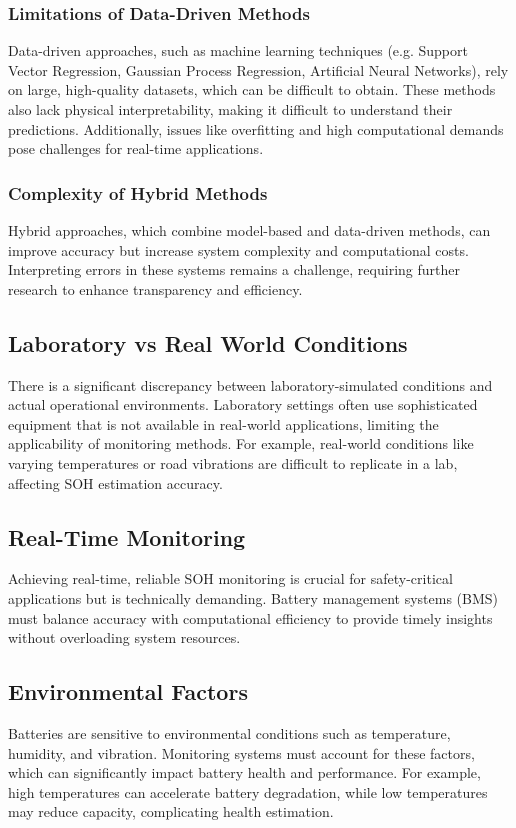 \subsubsection{Limitations of Data-Driven Methods}
Data-driven approaches, such as machine learning techniques (e.g. Support Vector Regression, Gaussian Process Regression, Artificial Neural Networks), rely on large, high-quality datasets, which can be difficult to obtain. 
These methods also lack physical interpretability, making it difficult to understand their predictions. 
Additionally, issues like overfitting and high computational demands pose challenges for real-time applications.

\subsubsection{Complexity of Hybrid Methods}
Hybrid approaches, which combine model-based and data-driven methods, can improve accuracy but increase system complexity and computational costs. 
Interpreting errors in these systems remains a challenge, requiring further research to enhance transparency and efficiency.

\subsection{Laboratory vs Real World Conditions}
There is a significant discrepancy between laboratory-simulated conditions and actual operational environments. 
Laboratory settings often use sophisticated equipment that is not available in real-world applications, limiting the applicability of monitoring methods. For example, real-world conditions like varying temperatures or road vibrations are difficult to replicate in a lab, affecting SOH estimation accuracy.

\subsection{Real-Time Monitoring}
Achieving real-time, reliable SOH monitoring is crucial for safety-critical applications but is technically demanding. 
Battery management systems (BMS) must balance accuracy with computational efficiency to provide timely insights without overloading system resources.

\subsection{Environmental Factors}
Batteries are sensitive to environmental conditions such as temperature, humidity, and vibration. 
Monitoring systems must account for these factors, which can significantly impact battery health and performance. 
For example, high temperatures can accelerate battery degradation, while low temperatures may reduce capacity, complicating health estimation.

